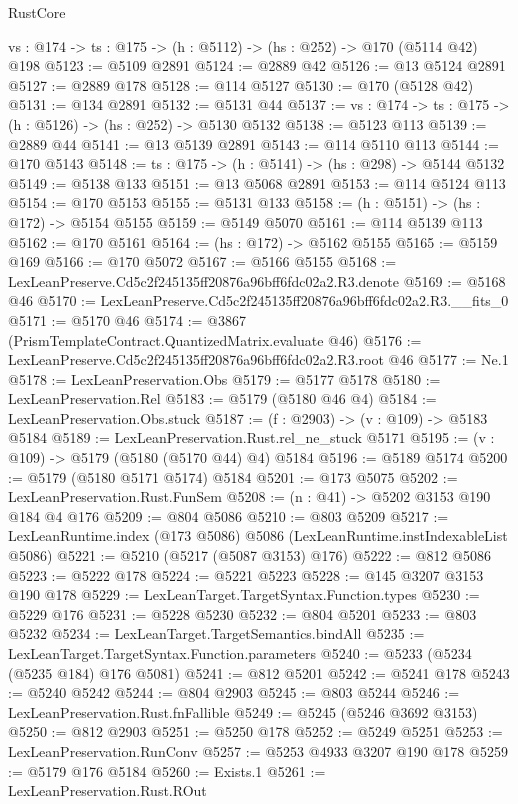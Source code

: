 \begin{lexlean}{RustCore}
\begin{coremodule}
  {vs : @174} -> {ts : @175} -> (h : @5112) -> (hs : @252) -> @170 (@5114 @42) @198
@5123 := @5109 @2891
@5124 := @2889 @42
@5126 := @13 @5124 @2891
@5127 := @2889 @178
@5128 := @114 @5127
@5130 := @170 (@5128 @42)
@5131 := @134 @2891
@5132 := @5131 @44
@5137 := {vs : @174} -> {ts : @175} -> (h : @5126) -> (hs : @252) -> @5130 @5132
@5138 := @5123 @113
@5139 := @2889 @44
@5141 := @13 @5139 @2891
@5143 := @114 @5110 @113
@5144 := @170 @5143
@5148 := {ts : @175} -> (h : @5141) -> (hs : @298) -> @5144 @5132
@5149 := @5138 @133
@5151 := @13 @5068 @2891
@5153 := @114 @5124 @113
@5154 := @170 @5153
@5155 := @5131 @133
@5158 := (h : @5151) -> (hs : @172) -> @5154 @5155
@5159 := @5149 @5070
@5161 := @114 @5139 @113
@5162 := @170 @5161
@5164 := (hs : @172) -> @5162 @5155
@5165 := @5159 @169
@5166 := @170 @5072
@5167 := @5166 @5155
@5168 := LexLeanPreserve.Cd5c2f245135ff20876a96bff6fdc02a2.R3.denote
@5169 := @5168 @46
@5170 := LexLeanPreserve.Cd5c2f245135ff20876a96bff6fdc02a2.R3.__fits_0
@5171 := @5170 @46
@5174 := @3867 (PrismTemplateContract.QuantizedMatrix.evaluate @46)
@5176 := LexLeanPreserve.Cd5c2f245135ff20876a96bff6fdc02a2.R3.root @46
@5177 := Ne.{1}
@5178 := LexLeanPreservation.Obs
@5179 := @5177 @5178
@5180 := LexLeanPreservation.Rel
@5183 := @5179 (@5180 @46 @4)
@5184 := LexLeanPreservation.Obs.stuck
@5187 := (f : @2903) -> (v : @109) -> @5183 @5184
@5189 := LexLeanPreservation.Rust.rel_ne_stuck @5171
@5195 := (v : @109) -> @5179 (@5180 (@5170 @44) @4) @5184
@5196 := @5189 @5174
@5200 := @5179 (@5180 @5171 @5174) @5184
@5201 := @173 @5075
@5202 := LexLeanPreservation.Rust.FunSem
@5208 := (n : @41) -> @5202 @3153 @190 @184 @4 @176
@5209 := @804 @5086
@5210 := @803 @5209
@5217 := LexLeanRuntime.index (@173 @5086) @5086 (LexLeanRuntime.instIndexableList @5086)
@5221 := @5210 (@5217 (@5087 @3153) @176)
@5222 := @812 @5086
@5223 := @5222 @178
@5224 := @5221 @5223
@5228 := @145 @3207 @3153 @190 @178
@5229 := LexLeanTarget.TargetSyntax.Function.types
@5230 := @5229 @176
@5231 := @5228 @5230
@5232 := @804 @5201
@5233 := @803 @5232
@5234 := LexLeanTarget.TargetSemantics.bindAll
@5235 := LexLeanTarget.TargetSyntax.Function.parameters
@5240 := @5233 (@5234 (@5235 @184) @176 @5081)
@5241 := @812 @5201
@5242 := @5241 @178
@5243 := @5240 @5242
@5244 := @804 @2903
@5245 := @803 @5244
@5246 := LexLeanPreservation.Rust.fnFallible
@5249 := @5245 (@5246 @3692 @3153)
@5250 := @812 @2903
@5251 := @5250 @178
@5252 := @5249 @5251
@5253 := LexLeanPreservation.RunConv
@5257 := @5253 @4933 @3207 @190 @178
@5259 := @5179 @176 @5184
@5260 := Exists.{1}
@5261 := LexLeanPreservation.Rust.ROut

\end{coremodule}
\end{lexlean}
